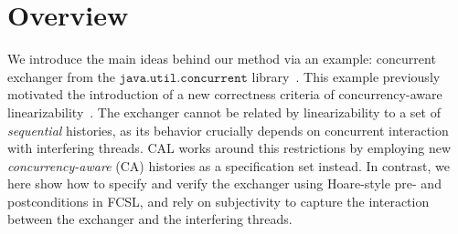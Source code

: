 \section{Overview}
\label{sec:overview}


We introduce the main ideas behind our method via an example:
concurrent exchanger from the $\mathtt{java.util.concurrent}$
library~\cite{Scherer-al:SCOOL05,ExchangerClass}. This example
previously motivated the introduction of a new correctness criteria of
concurrency-aware linearizability~\cite{Hemed-Rinetzky:PODC14}. The
exchanger cannot be related by linearizability to a set of
\emph{sequential} histories, as its behavior crucially depends on
concurrent interaction with interfering threads.
%
CAL works around this restrictions by employing new
\emph{concurrency-aware} (CA) histories as a specification set
instead.
%
In contrast, we here show how to specify and verify the exchanger
using Hoare-style pre- and postconditions in FCSL, and rely on
subjectivity to capture the interaction between the exchanger and the
interfering threads.

%
%

